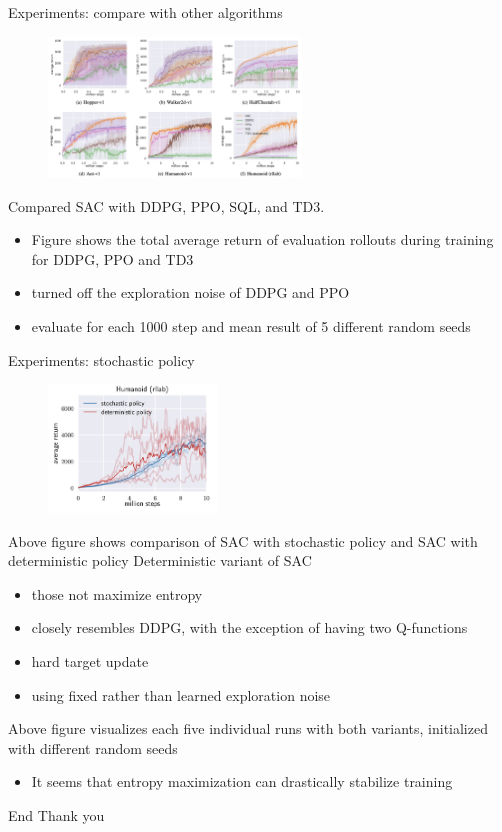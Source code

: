 \documentclass[8pt]{beamer}
\begin{document}
\begin{frame}{Experiments: compare with other algorithms}
    \begin{figure}
        \centering
        \includegraphics[width=0.6\textwidth]{fig1.png}
    \end{figure}


Compared SAC with DDPG, PPO, SQL, and TD3.
\begin{itemize}
    \item Figure shows the total average return of evaluation rollouts during training for DDPG, PPO and TD3
    \item turned off the exploration noise of DDPG and PPO
    \item evaluate for each 1000 step and mean result of 5 different random seeds
\end{itemize}
\end{frame}

\begin{frame}{Experiments: stochastic policy}
\begin{figure}
\centering
\includegraphics[width=0.4\textwidth]{fig2.png}
\end{figure}
Above figure shows comparison of SAC with stochastic policy and SAC with deterministic policy
Deterministic variant of SAC
\begin{itemize}
    \item those not maximize entropy
    \item closely resembles DDPG, with the exception of having two Q-functions
    \item hard target update
    \item using fixed rather than learned exploration noise
\end{itemize}

Above figure visualizes each five individual runs with both variants, initialized with different random seeds
\begin{itemize}
    \item It seems that entropy maximization can drastically stabilize training

\end{itemize}
\end{frame} 

\begin{frame}{End}
    Thank you
\end{frame}
\end{document}
